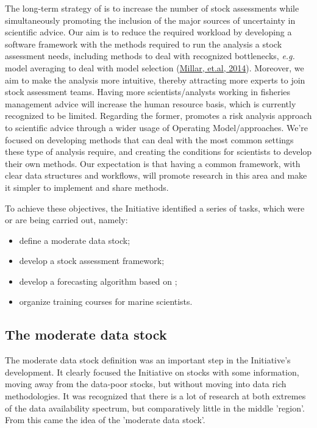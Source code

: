 \documentclass[a4paper,english,10pt]{article}\usepackage[]{graphicx}\usepackage[]{color}
\begin{document}
The long-term strategy of \aFa is to increase the number of stock assessments while simultaneously promoting the inclusion of the major sources of uncertainty in scientific advice. Our aim is to reduce the required workload by developing a software framework with the methods required to run the analysis a stock assessment needs, including methods to deal with recognized bottlenecks, \emph{e.g.} model averaging to deal with model selection (\href{http://icesjms.oxfordjournals.org/content/early/2014/03/31/icesjms.fsu043.abstract}{Millar, et.al, 2014}). Moreover, we aim to make the analysis more intuitive, thereby attracting more experts to join stock assessment teams. Having more scientists/analysts working in fisheries management advice will increase the human resource basis, which is currently recognized to be limited. Regarding the former, \aFa promotes a risk analysis approach to scientific advice through a wider usage of Operating Model/\MSE approaches. We're focused on developing methods that can deal with the most common settings these type of analysis require, and creating the conditions for scientists to develop their own methods. Our expectation is that having a common framework, with clear data structures and workflows, will promote research in this area and make it simpler to implement and share methods.

To achieve these objectives, the Initiative identified a series of tasks, which were or are being carried out, namely:
\begin{itemize}
	\item define a moderate data stock;
	\item develop a stock assessment framework;
	\item develop a forecasting algorithm based on \MSE;
	\item organize training courses for marine scientists.
\end{itemize}



\subsection{The moderate data stock}

The moderate data stock definition was an important step in the Initiative's development. It clearly focused the Initiative on stocks with some information, moving away from the data-poor stocks, but without moving into data rich methodologies. It was recognized that there is a lot of research at both extremes of the data availability spectrum, but comparatively little in the middle 'region'. From this came the idea of the 'moderate data stock'. 
\end{document}
